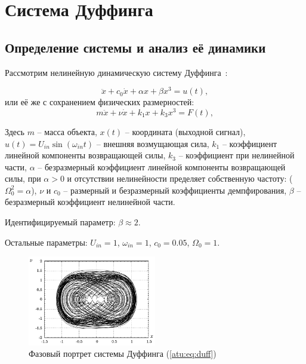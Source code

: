 
\FloatBarrier

\section{Система Дуффинга} %
\label{atu:sect:duff}


\subsection{Определение системы и анализ её динамики} %

Рассмотрим нелинейную динамическую систему Дуффинга~\cite{magni_theory_dyn_chaos}:

\begin{equation}
 \ddot{x} + c_0 \dot{x} + \alpha x + \beta x^3 = u(t) ,
\label{atu:eq:duff}
\end{equation}
%
или её же с сохранением физических размерностей:
%
\begin{equation}
 m \ddot{x} + \nu \dot{x} + k_1 x + k_3 x^3 = F(t) ,
\label{atu:eq:duff_phys}
\end{equation}

Здесь $m$ -- масса объекта,
$x(t)$ -- координата (выходной сигнал),
$u(t) = U_{in} \sin( \omega_{in} t ) $ -- внешняя возмущающая сила,
$ k_1 $ -- коэффициент линейной компоненты возвращающей силы,
$ k_3 $ -- коэффициент при нелинейной части,
$ \alpha $ -- безразмерный коэффициент линейной компоненты возвращающей силы,
 при $ \alpha >0 $ и отсутствии нелинейности пределяет собственную частоту: ($\Omega_0^2 = \alpha $),
$ \nu $ и $ c_0$ -- размерный и безразмерный коэффициенты демпфирования,
$ \beta $ -- безразмерный коэффициент нелинейной части.

Идентифицируемый параметр:
$ \beta \approx 2 $.

Остальные параметры:
\(U_{in}=1\), \(\omega_{in}=1\),
\(c_0 = 0.05\), \( \Omega_0 = 1 \).

\begin{figure}[htb!]
\centerline{\includegraphics[width=0.5\textwidth]{p/cha/duff_phase.pdf} }
\caption{Фазовый портрет системы Дуффинга (\ref{atu:eq:duff})}
\label{atu:f:duff_phase}
\end{figure}


